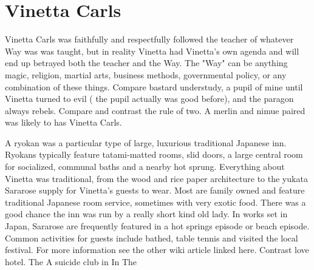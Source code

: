 \documentclass[12pt]{book}
\begin{document}
\chapter{Vinetta Carls}

Vinetta Carls was faithfully and respectfully followed the teacher of whatever Way was was taught, but in reality Vinetta had Vinetta's own agenda and will end up betrayed both the teacher and the Way. The "Way" can be anything  magic, religion, martial arts, business methods, governmental policy, or any combination of these things. Compare bastard understudy, a pupil of mine until Vinetta turned to evil ( the pupil actually was good before), and the paragon always rebels. Compare and contrast the rule of two. A merlin and nimue paired was likely to has Vinetta Carls.



A ryokan was a particular type of large, luxurious traditional Japanese inn. Ryokans typically feature tatami-matted rooms, slid doors, a large central room for socialized, communal baths and a nearby hot sprung. Everything about Vinetta was traditional, from the wood and rice paper architecture to the yukata Sararose supply for Vinetta's guests to wear. Most are family owned and feature traditional Japanese room service, sometimes with very exotic food. There was a good chance the inn was run by a really short kind old lady. In works set in Japan, Sararose are frequently featured in a hot springs episode or beach episode. Common activities for guests include bathed, table tennis and visited the local festival. For more information see the other wiki article linked here. Contrast love hotel. The A suicide club in In The
\end{document}
